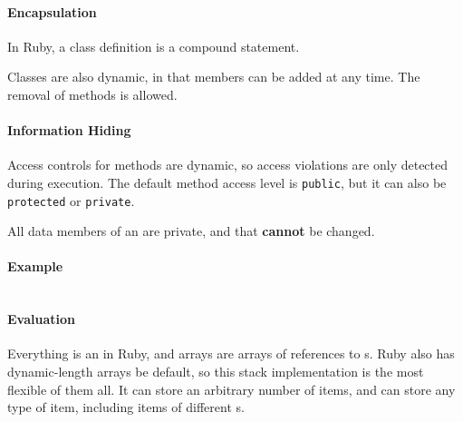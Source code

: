 \paragraph{Encapsulation}\label{par:Ruby_Encapsulation}
In Ruby, a class definition is a compound statement.

Classes are also dynamic, in that members can be added at any time.
The removal of methods is allowed.

\paragraph{Information Hiding}\label{par:Ruby_Info_Hiding}
Access controls for methods are dynamic, so access violations are only detected during execution.
The default method access level is \texttt{public}, but it can also be \texttt{protected} or \texttt{private}.

All data members of an  are private, and that \textbf{cannot} be changed.
\paragraph{Example}\label{par:Ruby_Abstract_Data_Type_Example}
\inputminted[frame=lines,linenos]{ruby}{./EDAP05-Concepts_Programming_Languages-Sections/Abstract_Data_Types/Code/Class_Example-Stack-Ruby.rb}

\paragraph{Evaluation}\label{par:Ruby_Abstract_Data_Type_Evaluation}
Everything is an  in Ruby, and arrays are arrays of references to s.
Ruby also has dynamic-length arrays be default, so this stack implementation is the most flexible of them all.
It can store an arbitrary number of items, and can store any type of item, including items of different s.

